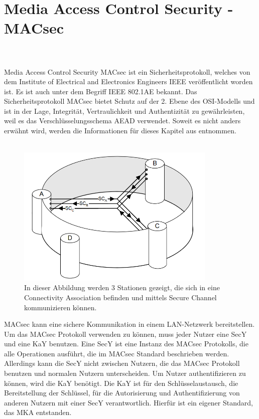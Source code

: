 \section{Media Access Control Security - MACsec}
\label{sec:Media Access Control Security - MACsec}
\\
\\
Media Access Control Security \gls{MACsec} ist ein Sicherheitsprotokoll, welches von dem Institute of Electrical and Electronics Engineers \gls{IEEE} veröffentlicht worden ist. Es ist auch unter dem Begriff IEEE 802.1AE bekannt. Das Sicherheitsprotokoll \gls{MACsec} bietet Schutz auf der 2. Ebene des \gls{OSI-Modell}s und ist in der Lage, Integrität, Vertraulichkeit und Authentizität zu gewährleisten, weil es das Verschlüsselungsschema \gls{AEAD} verwendet.
Soweit es nicht anders erwähnt wird, werden die Informationen für dieses Kapitel aus \cite{1678345} entnommen.\\
\\
\begin{figure}
\centering
	\includegraphics[width=0.85\textwidth]{images/MACsec_CA.PNG}
	\caption[Modell der MACsec Connectivity Association]{In dieser Abbildung werden 3 Stationen gezeigt, die sich in eine Connectivity Association befinden und mittels Secure Channel kommunizieren können.  }
	\label{img:MACsec_CA}
\end{figure}\gls{MACsec} kann eine sichere Kommunikation in einem LAN-Netzwerk bereitstellen. Um das \gls{MACsec} Protokoll verwenden zu können, muss jeder Nutzer eine \gls{SecY} und eine \gls{KaY} benutzen. Eine \gls{SecY} ist eine Instanz des \gls{MACsec} Protokolls, die alle Operationen ausführt, die im MACsec Standard beschrieben werden. Allerdings kann die \gls{SecY} nicht zwischen Nutzern, die das \gls{MACsec} Protokoll benutzen und normalen Nutzern unterscheiden. Um Nutzer authentifizieren zu können, wird die \gls{KaY} benötigt. Die \gls{KaY} ist für den Schlüsselaustausch, die Bereitstellung der Schlüssel, für die Autorisierung und Authentifizierung von anderen Nutzern mit einer \gls{SecY} verantwortlich. Hierfür ist ein eigener Standard, das \gls{MKA} entstanden\cite{5409813}.\\
